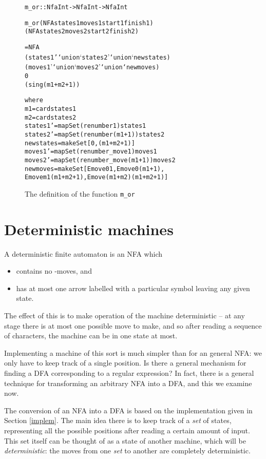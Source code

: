 \documentclass[11pt]{article}
\begin{document}
\begin{figure}
\begin{alltt}
m\_or :: Nfa Int -> Nfa Int -> Nfa Int

m\_or (NFA states1 moves1 start1 finish1) 
     (NFA states2 moves2 start2 finish2)

  = NFA
    (states1' `union` states2' `union` newstates)
    (moves1' `union` moves2' `union` newmoves)
    0
    (sing (m1+m2+1))

    where
    m1 = card states1
    m2 = card states2
    states1' = mapSet (renumber 1) states1
    states2' = mapSet (renumber (m1+1)) states2
    newstates = makeSet [0,(m1+m2+1)]
    moves1'  = mapSet (renumber\_move 1) moves1
    moves2'  = mapSet (renumber\_move (m1+1)) moves2
    newmoves = makeSet [ Emove 0 1 , Emove 0 (m1+1) ,
                       Emove m1 (m1+m2+1) , Emove (m1+m2) (m1+m2+1) ]
\end{alltt}
\caption{The definition of the function \texttt{m\_or}}
\label{mor-def}
\end{figure}

\section{Deterministic machines}

A deterministic finite automaton is an NFA which
\begin{itemize}
\item contains no \eps-moves, and
\item has at most one arrow labelled with a particular symbol leaving any
given state.
\end{itemize}
The effect of this is to make operation of the machine deterministic -- at any
stage there is at most one possible move to make, and so after reading a
sequence of characters, the machine can be in one state at most.

Implementing a machine of this sort is much simpler than for an general NFA:
we only have to keep track of a single position. Is there a general mechanism
for finding a DFA corresponding to a regular expression? In fact, there is
a general technique for transforming an arbitrary NFA into a DFA, and this we
examine now.

The conversion of an NFA into a DFA is based on the implementation given in
Section \ref{implem}. The main idea there is to keep track of a {\em set\/} of 
states, representing all the possible positions after reading a certain amount
of input. This set itself can be thought of as a state of another machine,
which will be {\em deterministic}: the moves from one {\em set\/} to another
are completely deterministic.
\end{document}
